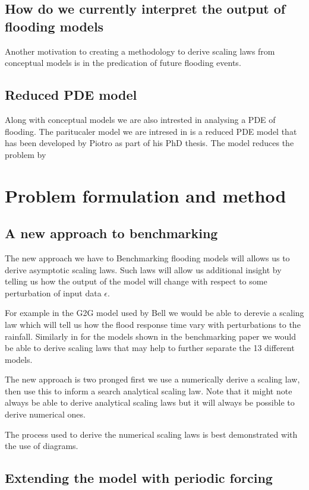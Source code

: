\documentclass[11pt]{article}
\begin{document}
\subsection{How do we currently interpret the output of flooding models}
Another motivation to creating a methodology to derive scaling laws from conceptual models is in the predication of future flooding events.


\subsection{Reduced PDE model}

Along with conceptual models we are also intrested in analysing a PDE of flooding. The paritucaler model we are intresed in is a reduced PDE model that has been developed by Piotro as part of his PhD thesis. The model reduces the problem by 


\section{Problem formulation and method}

\subsection{A new approach to benchmarking}
The new approach we have to Benchmarking flooding models will allows us to derive asymptotic scaling laws. 
Such laws will allow us additional insight by telling us how the output of the model will change with respect to some perturbation of input data $\epsilon$.

For example in the G2G model used by Bell we would be able to derevie a scaling law which will tell us how the flood response time vary with perturbations to the rainfall. Similarly in for the models shown in the benchmarking paper we would be able to derive scaling laws that may help to further separate the 13 different models.

The new approach is two pronged first we use a numerically derive a scaling law, then use this to inform a search analytical scaling law. Note that it might note always be able to derive analytical scaling laws but it will always be possible to derive numerical ones.

The process used to derive the numerical scaling laws is best demonstrated with the use of diagrams.


\subsection{Extending the model with periodic forcing}
\end{document}
